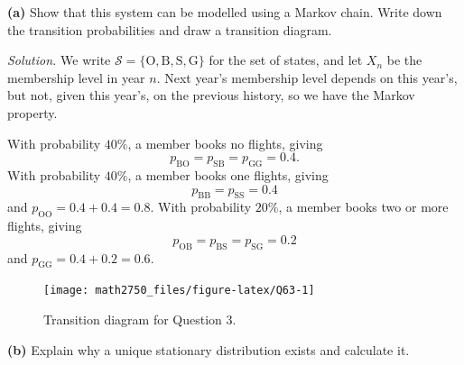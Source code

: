 \documentclass[
  a4paper,
]{article}
\theoremstyle{definition}
\theoremstyle{definition}
\theoremstyle{definition}
\theoremstyle{remark}
\begin{document}
\textbf{(a)} Show that this system can be modelled using a Markov chain. Write down the transition probabilities and draw a transition diagram.

\begin{myanswers}

\emph{Solution.}
We write \(\mathcal S = \{\text{O},\text{B},\text{S},\text{G}\}\) for the set of states, and let \(X_n\) be the membership level in year \(n\). Next year's membership level depends on this year's, but not, given this year's, on the previous history, so we have the Markov property.

With probability \(40\%\), a member books no flights, giving
\[ p_{\mathrm{BO}} = p_{\mathrm{SB}} = p_{\mathrm{GG}} = 0.4 . \]
With probability \(40\%\), a member books one flights, giving
\[ p_{\mathrm{BB}} = p_{\mathrm{SS}} = 0.4  \]
and \(p_{\mathrm{OO}} = 0.4+0.4 = 0.8\).
With probability \(20\%\), a member books two or more flights, giving
\[ p_{\mathrm{OB}} = p_{\mathrm{BS}} = p_{\mathrm{SG}} = 0.2  \]
and \(p_{\mathrm{GG}} = 0.4+0.2 = 0.6\).

\begin{figure}

{\centering \texttt{[image: math2750\_files/figure-latex/Q63-1]} 

}

\caption{Transition diagram for Question 3.}\label{fig:Q63}
\end{figure}

\end{myanswers}

\textbf{(b)} Explain why a unique stationary distribution exists and calculate it.
\end{document}
